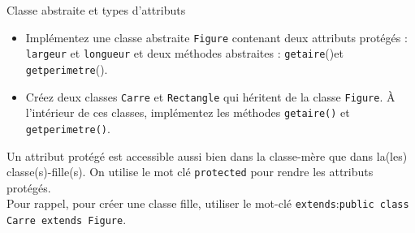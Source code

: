 	
	\begin{Exercice}[10 minutes]{Classe abstraite et types d'attributs}
	\begin{itemize}
		\item Implémentez une classe abstraite \lstinline{Figure} contenant deux attributs protégés : \lstinline{largeur} et \lstinline{longueur} et deux méthodes abstraites : \lstinline{getaire}()et \lstinline{getperimetre}().
		\item Créez deux classes \lstinline{Carre} et \lstinline{Rectangle} qui héritent de la classe \lstinline{Figure}. À l'intérieur de ces classes, implémentez les méthodes \lstinline{getaire()} et \lstinline{getperimetre()}.
	\end{itemize}
	
	\begin{conseil}
		Un attribut protégé est accessible aussi bien dans la classe-mère que dans la(les) classe(s)-fille(s). On utilise le mot clé \lstinline{protected} pour rendre les attributs protégés. \\
		Pour rappel, pour créer une classe fille, utiliser le mot-clé \lstinline{extends}:\lstinline{public class Carre extends Figure}.
	\end{conseil}
	
	
	\begin{solution}
	 
	\end{solution}
	\end{Exercice}
	
	\newpage
